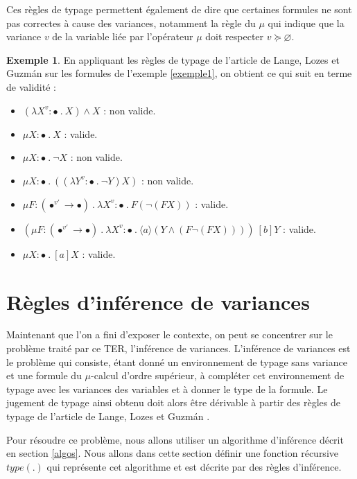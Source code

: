 \documentclass{rapport}
\theoremstyle{plain}
\theoremstyle{remark}
\theoremstyle{definition}
\newtheorem{exem}{Exemple}
\begin{document}
Ces règles de typage permettent également de dire que certaines formules ne sont pas correctes à cause des variances, notamment la règle du $\mu$ qui indique que la variance $v$ de la variable liée par l'opérateur $\mu$ doit respecter $v \succcurlyeq \varnothing$.

\begin{exem}\label{exemple2}
En appliquant les règles de typage de l'article de Lange, Lozes et Guzm{\'a}n \citep{lange2014model} sur les formules de l'exemple \ref{exemple1}, on obtient ce qui suit en terme de validité :
\begin{itemize}
	\item $(\lambda X^{v} : \bullet \ . \ X) \wedge X$ : non valide. 
	\item $\mu X : \bullet \ . \  X$ : valide.
	\item $\mu X : \bullet \ . \  \neg X$ : non valide.
	\item $\mu X : \bullet \ . \  ((\lambda Y^{v} : \bullet \ . \ \neg Y)X)$ : non valide.
	\item $\mu F : (\bullet^{v'} \rightarrow \bullet) \ . \  \lambda X^{v} : \bullet \ . \ F (\neg (F X))$ : valide.
	\item $(\mu F : (\bullet^{v'} \rightarrow \bullet) \ . \ \lambda X^{v} : \bullet \ . \ \langle a \rangle (Y \wedge (F \neg(F X)))) \ [b] Y$ : valide.
	\item $\mu X : \bullet \ . \ [a]X$ : valide.
\end{itemize}
\end{exem}

\section{Règles d'inférence de variances\label{regles}}

Maintenant que l'on a fini d'exposer le contexte, on peut se concentrer sur le problème traité par ce TER, l'inférence de variances. L'inférence de variances est le problème qui consiste, étant donné un environnement de typage sans variance et une formule du $\mu$-calcul d'ordre supérieur, à compléter cet environnement de typage avec les variances des variables et à donner le type de la formule. Le jugement de typage ainsi obtenu doit alors être dérivable à partir des règles de typage de l'article de Lange, Lozes et Guzm{\'a}n \citep{lange2014model}.

Pour résoudre ce problème, nous allons utiliser un algorithme d'inférence décrit en section \ref{algos}. Nous allons dans cette section définir une fonction récursive $type(.)$ qui représente cet algorithme et est décrite par des règles d'inférence. 
\end{document}
